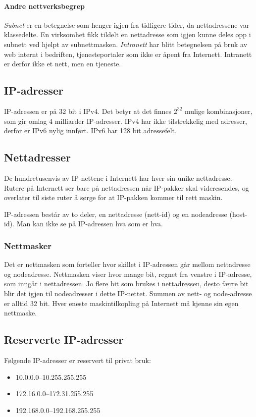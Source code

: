 \documentclass[11pt,a4paper]{article}
\begin{document}
\paragraph{Andre nettverksbegrep}
\textit{Subnet} er en betegnelse som henger igjen fra tidligere tider, da nettadressene var klassedelte. En virksomhet fikk tildelt en nettadresse som igjen kunne deles opp i subnett ved hjelpt av subnettmasken.
\textit{Intranett} har blitt betegnelsen på bruk av web internt i bedriften, tjenesteportaler som ikke er åpent fra Internett. Intranett er derfor ikke et nett, men en tjeneste.

\subsection{IP-adresser}
IP-adressen er på 32 bit i IPv4. Det betyr at det finnes $2^{32}$ mulige kombinasjoner, som gir omlag 4 milliarder IP-adresser. IPv4 har ikke tilstrekkelig med adresser, derfor er IPv6 nylig innført. IPv6 har 128 bit adressefelt.

\subsection{Nettadresser}
De hundretusenvis av IP-nettene i Internett har hver sin unike nettadresse. Rutere på Internett ser bare på nettadressen når IP-pakker skal videresendes, og overlater til siste ruter å sørge for at IP-pakken kommer til rett maskin. 

IP-adressen består av to deler, en nettadresse (nett-id) og en nodeadresse (host-id). Man kan ikke se på IP-adressen hva som er hva.

\subsubsection{Nettmasker}
Det er nettmasken som forteller hvor skillet i IP-adressen går mellom nettadresse og nodeadresse. Nettmasken viser hvor mange bit, regnet fra venstre i IP-adresse, som inngår i nettadressen. Jo flere bit som brukes i nettadressen, desto færre bit blir det igjen til nodeadresser i dette IP-nettet. Summen av nett- og node-adresse er alltid 32 bit. Hver eneste maskintilkopling på Internett må kjenne sin egen nettmaske.

\subsection{Reserverte IP-adresser}
Følgende IP-adresser er reservert til privat bruk:
\begin{itemize}
\item{10.0.0.0--10.255.255.255}
\item{172.16.0.0--172.31.255.255}
\item{192.168.0.0--192.168.255.255}
\end{itemize}
\end{document}
